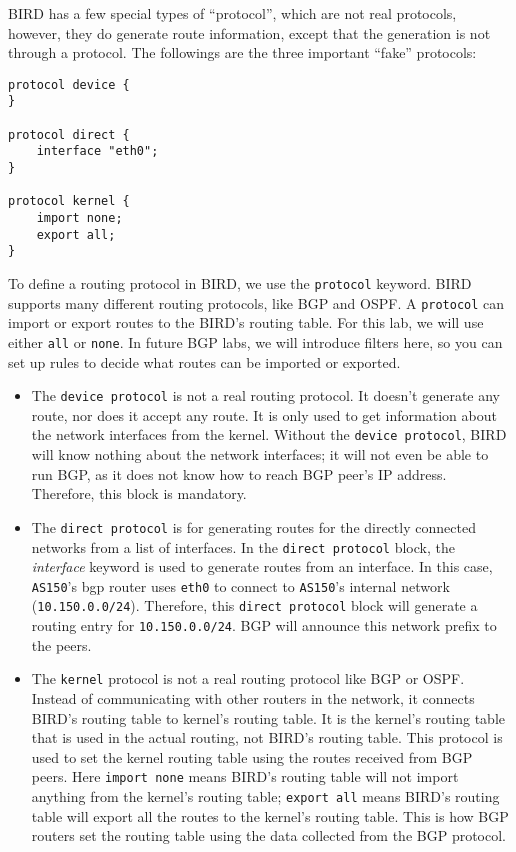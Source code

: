 BIRD has a few special types of ``protocol'', which are not
real protocols, however, they do generate route information,
except that the generation is not through a protocol. 
The followings
are the three important ``fake'' protocols:

\begin{lstlisting}[caption={The \texttt{bird.conf} file for \texttt{AS150}}]
protocol device {
}

protocol direct {
    interface "eth0";
}

protocol kernel {
    import none;
    export all;
}
\end{lstlisting}

To define a routing protocol in BIRD, we use the \texttt{protocol} keyword.
BIRD supports many different routing protocols, like BGP and OSPF. A
\texttt{protocol} can import or export routes to the BIRD's routing table.
For this lab, we will use either \texttt{all} or \texttt{none}. In future
BGP labs, we will introduce filters here, so you can set up
rules to decide what routes can be imported or exported.

\begin{itemize}

\item The \texttt{device protocol} is not a real routing protocol. It doesn't
generate any route, nor does it accept any route. It is only used to get
information about the network interfaces from the kernel. Without the
\texttt{device protocol}, BIRD will know nothing about the network
interfaces; it will not even be able to run BGP, as it does not know how
to reach BGP peer's IP address. Therefore, this block is mandatory.

\item The \texttt{direct protocol} is for generating routes for the directly
connected networks from a list of interfaces. In the \texttt{direct protocol}
block, the \textit{interface} keyword is used to generate routes from an
interface. In this case, \texttt{AS150}'s bgp router uses \texttt{eth0} to
connect to \texttt{AS150}'s internal network (\texttt{10.150.0.0/24}).
Therefore, this \texttt{direct protocol} block will generate a routing
entry for \texttt{10.150.0.0/24}. BGP will announce this network
prefix to the peers.

\item The \texttt{kernel} protocol is not a real routing protocol like BGP or
OSPF. Instead of communicating with other routers in the network, it connects
BIRD's routing table to kernel's routing table. It is the kernel's routing table
that is used in the actual routing, not BIRD's routing table.
This protocol is used to set the kernel routing table using the routes
received from BGP peers. Here
\texttt{import none} means BIRD's routing table will not import anything from
the kernel's routing table; \texttt{export all} means BIRD's routing table
will export all the routes to the kernel's routing table. This is how BGP
routers set the routing table using the data collected from the BGP
protocol.
\end{itemize}


